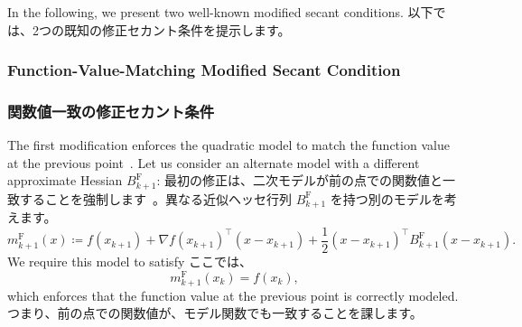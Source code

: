 \documentclass[0_main]{subfiles}
\begin{document}
\ifEn
    In the following, we present two well-known modified secant conditions.
\else
    以下では、2つの既知の修正セカント条件を提示します。
\fi

\ifEn
    \subsubsection{Function-Value-Matching Modified Secant Condition}
\else
    \subsubsection{関数値一致の修正セカント条件}
\fi
\label{subsubsec:yuan}

\ifEn
    The first modification enforces the quadratic model to match the function value at the previous point~\citep{yuanModifiedBFGSAlgorithm1991,weiNewQuasiNewtonMethods2006, babaie-kafakiModifiedBFGSAlgorithm2011}. Let us consider an alternate model with a different approximate Hessian $B_{k+1}^{\mathrm{F}}$:
\else
    最初の修正は、二次モデルが前の点での関数値と一致することを強制します~\citep{yuanModifiedBFGSAlgorithm1991,weiNewQuasiNewtonMethods2006, babaie-kafakiModifiedBFGSAlgorithm2011}。異なる近似ヘッセ行列 $B_{k+1}^{\mathrm{F}}$ を持つ別のモデルを考えます。
\fi
\begin{equation*}
    m_{k+1}^{\mathrm{F}}(x) \coloneqq f(x_{k+1}) + \nabla f(x_{k+1})^\top (x - x_{k+1}) + \frac{1}{2} (x - x_{k+1})^\top B_{k+1}^{\mathrm{F}} (x - x_{k+1}).
\end{equation*}
\ifEn
    We require this model to satisfy
\else
    ここでは、
\fi
\begin{equation*}
    m_{k+1}^{\mathrm{F}}(x_k) = f(x_k),
\end{equation*}
\ifEn
    which enforces that the function value at the previous point is correctly modeled.
\else
    つまり、前の点での関数値が、モデル関数でも一致することを課します。
\fi
\end{document}
